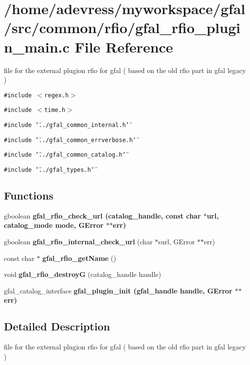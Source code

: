 \section{/home/adevress/myworkspace/gfal/src/common/rfio/gfal\_\-rfio\_\-plugin\_\-main.c File Reference}
\label{gfal__rfio__plugin__main_8c}
file for the external plugion rfio for gfal ( based on the old rfio part in gfal legacy ) 

{\tt \#include $<$regex.h$>$}\par
{\tt \#include $<$time.h$>$}\par
{\tt \#include \char`\"{}../gfal\_\-common\_\-internal.h\char`\"{}}\par
{\tt \#include \char`\"{}../gfal\_\-common\_\-errverbose.h\char`\"{}}\par
{\tt \#include \char`\"{}../gfal\_\-common\_\-catalog.h\char`\"{}}\par
{\tt \#include \char`\"{}../gfal\_\-types.h\char`\"{}}\par
\subsection*{Functions}
\begin{CompactItemize}
\item 
gboolean \bf{gfal\_\-rfio\_\-check\_\-url} (catalog\_\-handle, const char $\ast$url, catalog\_\-mode mode, GError $\ast$$\ast$err)
\item 
gboolean \textbf{gfal\_\-rfio\_\-internal\_\-check\_\-url} (char $\ast$surl, GError $\ast$$\ast$err)\label{gfal__rfio__plugin__main_8c_c5e436536797abe10805df63cd82d9eb}

\item 
const char $\ast$ \textbf{gfal\_\-rfio\_\-get\-Name} ()\label{gfal__rfio__plugin__main_8c_621cd96c7d439a5ae88cbc03960b3e8d}

\item 
void \textbf{gfal\_\-rfio\_\-destroy\-G} (catalog\_\-handle handle)\label{gfal__rfio__plugin__main_8c_5d5e134df56b9dab9254ac9ba04c7671}

\item 
gfal\_\-catalog\_\-interface \bf{gfal\_\-plugin\_\-init} (gfal\_\-handle handle, GError $\ast$$\ast$err)
\end{CompactItemize}


\subsection{Detailed Description}
file for the external plugion rfio for gfal ( based on the old rfio part in gfal legacy ) 

